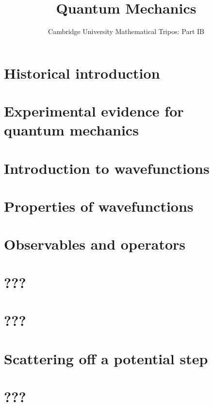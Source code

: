 \documentclass{article}
\title{Quantum Mechanics}
\author{Cambridge University Mathematical Tripos: Part IB}
\begin{document}
\maketitle

\tableofcontentsnewpage{}

\section{Historical introduction}

\section{Experimental evidence for quantum mechanics}

\section{Introduction to wavefunctions}

\section{Properties of wavefunctions}

\section{Observables and operators}

\section{???}

\section{???}

\section{Scattering off a potential step}

\section{???}

\end{document}
